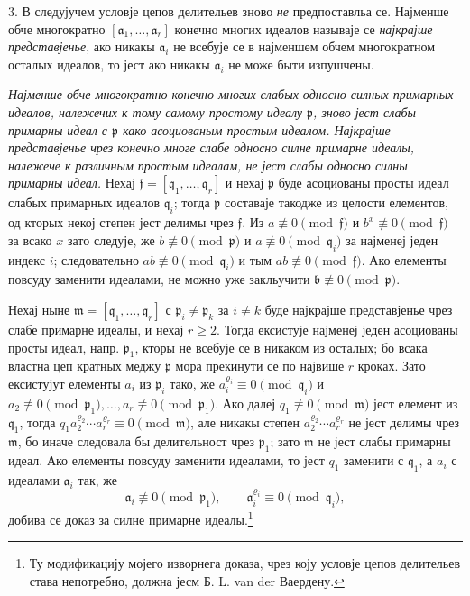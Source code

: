 \documentclass[11pt]{article}
\providecommand{\ma}{\mathfrak{a}}
\providecommand{\mb}{\mathfrak{b}}
\providecommand{\mf}{\mathfrak{f}}
\providecommand{\mm}{\mathfrak{m}}
\providecommand{\mq}{\mathfrak{q}}
\providecommand{\mpideal}{\mathfrak{p}}
\begin{document}
3. В следујучем условје цепов делительев зново \emph{не} предпоставльа се. Најменше обче многократно $[\ma_1,\ldots,\ma_r]$ конечно многих идеалов называје се \emph{најкрајше представјенье}, ако никакы $\ma_i$ не всебује се в најменшем обчем многократном осталых идеалов, то јест ако никакы $\ma_i$ не може быти изпушчены.

\emph{Најменше обче многократно конечно многих слабых односно силных примарных идеалов, належечих к тому самому простому идеалу $\mpideal$, зново јест слабы примарны идеал с $\mpideal$ како асоциованым простым идеалом. Најкрајше представјенье чрез конечно многе слабе односно силне примарне идеалы, належече к различным простым идеалам, не јест слабы односно силны примарны идеал.} Нехај $\mf=[\mq_1,\ldots,\mq_r]$ и нехај $\mpideal$ буде асоциованы просты идеал слабых примарных идеалов $\mq_i$; тогда $\mpideal$ составаје такодже из целости елементов, од кторых некој степен јест делимы чрез $\mf$. Из $a\not\equiv0\pmod{\mf}$ и $b^x\not\equiv0\pmod{\mf}$ за всако $x$ зато следује, же $b\not\equiv0\pmod{\mpideal}$ и $a\not\equiv0\pmod{\mq_i}$ за најменеј једен индекс $i$; следовательно $ab\not\equiv0\pmod{\mq_i}$ и тым $ab\not\equiv0\pmod{\mf}$. Ако елементы повсуду заменити идеалами, не можно уже закльучити $\mb\not\equiv0\pmod{\mpideal}$.

Нехај ныне $\mm=[\mq_1,\ldots,\mq_r]$ с $\mpideal_i\ne\mpideal_k$ за $i\ne k$ буде најкрајше представјенье чрез слабе примарне идеалы, и нехај $r\ge2$. Тогда ексистује најменеј једен асоциованы просты идеал, напр. $\mpideal_1$, кторы не всебује се в никаком из осталых; бо всака властна цеп кратных меджу $\mpideal$ мора прекинути се по највише $r$ кроках. Зато ексистујут елементы $a_i$ из $\mpideal_i$ тако, же $a_i^{\varrho_i}\equiv0\pmod{\mq_i}$ и $a_2\not\equiv0\pmod{\mpideal_1},\ldots,a_r\not\equiv0\pmod{\mpideal_1}$. Ако далеј $q_1\not\equiv0\pmod{\mm}$ јест елемент из $\mq_1$, тогда $q_1 a_2^{\varrho_2}\cdots a_r^{\varrho_r}\equiv0\pmod{\mm}$, але никакы степен $a_2^{\varrho_2}\cdots a_r^{\varrho_r}$ не јест делимы чрез $\mm$, бо иначе следовала бы делительност чрез $\mpideal_1$; зато $\mm$ не јест слабы примарны идеал. Ако елементы повсуду заменити идеалами, то јест $q_1$ заменити с $\mq_1$, а $a_i$ с идеалами $\ma_i$ так, же
\[
\ma_i\not\equiv0\pmod{\mpideal_1},\qquad
\ma_i^{\varrho_i}\equiv0\pmod{\mq_i},
\]
добива се доказ за силне примарне идеалы.\footnote{Ту модификацију мојего изворнега доказа, чрез коју условје цепов делительев става непотребно, должна јесм Б. L. van der Ваердену.}
\end{document}
